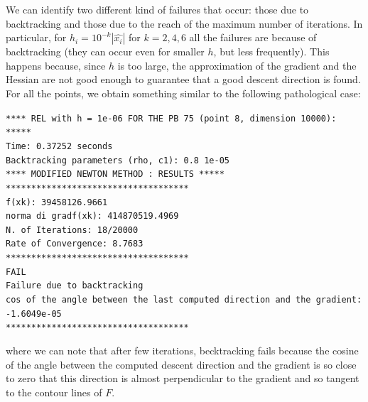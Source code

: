 We can identify two different kind of failures that occur: those due to backtracking and those due to the reach of the maximum number of iterations.
In particular, for $h_i=10^{-k}|\hat{x_i}|$ for $k=2,4,6$ all the failures are because of backtracking (they can occur even for smaller $h$, but less frequently). 
This happens because, since $h$ is too large, the approximation 
of the gradient and the Hessian are not good enough to guarantee that a good descent direction is found. For 
all the points, we obtain something similar to the following pathological case:
\begin{list}{}{\setlength{\leftmargin}{0.7cm}}
    \item \texttt{**** REL with h = 1e-06 FOR THE PB 75 (point 8, dimension 10000):  ***** \\
    Time: 0.37252 seconds \\
    Backtracking parameters (rho, c1): 0.8 1e-05 \\
    **** MODIFIED NEWTON METHOD : RESULTS ***** \\
    ************************************ \\
    f(xk): 39458126.9661 \\
    norma di gradf(xk): 414870519.4969 \\
    N. of Iterations: 18/20000 \\
    Rate of Convergence: 8.7683 \\
    ************************************ \\
    FAIL \\
    Failure due to backtracking \\
    cos of the angle between the last computed direction and the gradient: -1.6049e-05 \\
    ************************************
    }
\end{list}
where we can note that after few iterations, becktracking fails because the cosine of the angle between the computed descent direction
and the gradient is so close to zero that this direction is almost perpendicular to the gradient and so tangent to the contour lines of $F$.

